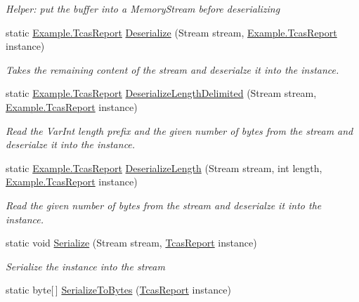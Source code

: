 \begin{DoxyCompactItemize}
\begin{DoxyCompactList}\small\item\em Helper\+: put the buffer into a Memory\+Stream before deserializing\end{DoxyCompactList}\item 
static \hyperlink{class_example_1_1_tcas_report}{Example.\+Tcas\+Report} \hyperlink{class_example_1_1_tcas_report_ab155a0521aabdf8a0ef91cd1a4932aa1}{Deserialize} (Stream stream, \hyperlink{class_example_1_1_tcas_report}{Example.\+Tcas\+Report} instance)
\begin{DoxyCompactList}\small\item\em Takes the remaining content of the stream and deserialze it into the instance.\end{DoxyCompactList}\item 
static \hyperlink{class_example_1_1_tcas_report}{Example.\+Tcas\+Report} \hyperlink{class_example_1_1_tcas_report_a19357c6915072658c1bdb5e4969acee6}{Deserialize\+Length\+Delimited} (Stream stream, \hyperlink{class_example_1_1_tcas_report}{Example.\+Tcas\+Report} instance)
\begin{DoxyCompactList}\small\item\em Read the Var\+Int length prefix and the given number of bytes from the stream and deserialze it into the instance.\end{DoxyCompactList}\item 
static \hyperlink{class_example_1_1_tcas_report}{Example.\+Tcas\+Report} \hyperlink{class_example_1_1_tcas_report_a9c164eb47708f5c254c6b793de0efd91}{Deserialize\+Length} (Stream stream, int length, \hyperlink{class_example_1_1_tcas_report}{Example.\+Tcas\+Report} instance)
\begin{DoxyCompactList}\small\item\em Read the given number of bytes from the stream and deserialze it into the instance.\end{DoxyCompactList}\item 
static void \hyperlink{class_example_1_1_tcas_report_a54cf22e91a20b051dc9b50be3292f0c2}{Serialize} (Stream stream, \hyperlink{class_example_1_1_tcas_report}{Tcas\+Report} instance)
\begin{DoxyCompactList}\small\item\em Serialize the instance into the stream\end{DoxyCompactList}\item 
static byte\mbox{[}$\,$\mbox{]} \hyperlink{class_example_1_1_tcas_report_aad7a3320484bf00a2f238c95d61cb2f5}{Serialize\+To\+Bytes} (\hyperlink{class_example_1_1_tcas_report}{Tcas\+Report} instance)

\end{DoxyCompactItemize}
